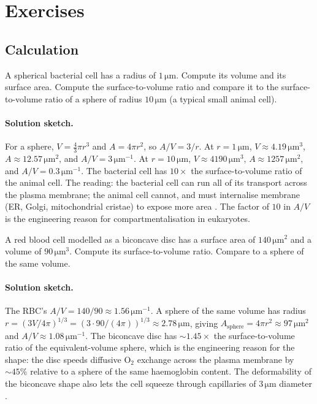 \section{Exercises}

\subsection*{Calculation}

\begin{exercise}
A spherical bacterial cell has a radius of $1\,\si{\micro\meter}$.
Compute its volume and its surface area. Compute the surface-to-volume
ratio and compare it to the surface-to-volume ratio of a sphere of
radius $10\,\si{\micro\meter}$ (a typical small animal cell).
\end{exercise}

\paragraph{Solution sketch.}
For a sphere, $V = \tfrac{4}{3}\pi r^3$ and $A = 4\pi r^2$, so
$A/V = 3/r$. At $r = 1\,\si{\micro\meter}$,
$V \approx 4.19\,\si{\micro\meter}^3$,
$A \approx 12.57\,\si{\micro\meter}^2$, and
$A/V = 3\,\si{\micro\meter}^{-1}$. At $r = 10\,\si{\micro\meter}$,
$V \approx 4190\,\si{\micro\meter}^3$,
$A \approx 1257\,\si{\micro\meter}^2$, and
$A/V = 0.3\,\si{\micro\meter}^{-1}$. The bacterial cell has $10\times$
the surface-to-volume ratio of the animal cell. The reading: the
bacterial cell can run all of its transport across the plasma
membrane; the animal cell cannot, and must internalise membrane (ER,
Golgi, mitochondrial cristae) to expose more area
\cite[ch.~1]{text:v6c01-alberts-mbc-2022}. The factor of $10$ in
$A/V$ is the engineering reason for compartmentalisation in
eukaryotes.

\begin{exercise}
A red blood cell modelled as a biconcave disc has a surface area of
$140\,\si{\micro\meter}^2$ and a volume of $90\,\si{\micro\meter}^3$.
Compute its surface-to-volume ratio. Compare to a sphere of the same
volume.
\end{exercise}

\paragraph{Solution sketch.}
The RBC's $A/V = 140/90 \approx 1.56\,\si{\micro\meter}^{-1}$. A
sphere of the same volume has radius
$r = (3V/4\pi)^{1/3}
= (3 \cdot 90 / (4\pi))^{1/3} \approx 2.78\,\si{\micro\meter}$,
giving $A_{\text{sphere}} = 4\pi r^2 \approx 97\,\si{\micro\meter}^2$
and $A/V \approx 1.08\,\si{\micro\meter}^{-1}$. The biconcave disc has
$\sim 1.45\times$ the surface-to-volume ratio of the
equivalent-volume sphere, which is the engineering reason for the
shape: the disc speeds diffusive O$_2$ exchange across the plasma
membrane by $\sim 45\%$ relative to a sphere of the same haemoglobin
content. The deformability of the biconcave shape also lets the cell
squeeze through capillaries of $3\,\si{\micro\meter}$ diameter
\cite[ch.~22]{text:v6c01-alberts-mbc-2022}.

